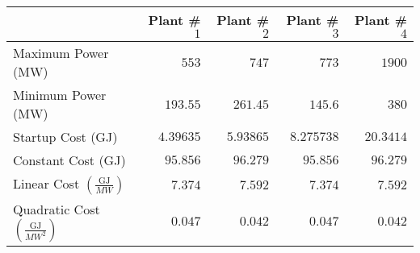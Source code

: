 \begin{tabular}{| l || r | r | r | r |}
  \hline
  & Plant \#$1$ & Plant \#$2$ & Plant \#$3$ & Plant \#$4$ \\
  \hline \hline
  Maximum Power (MW) & $553$ & $747$ & $773$ & $1900$ \\ \hline
  Minimum Power (MW) & $193.55$ & $261.45$ & $145.6$ & $380$ \\ \hline
  Startup Cost (GJ) & $4.39635$ & $5.93865$ & $8.275738$ & $20.3414$ \\ \hline
  Constant Cost (GJ) & $95.856$ & $96.279$ & $95.856$ & $96.279$ \\ \hline
  Linear Cost $(\frac{\text{GJ}}{MW})$ & $7.374$ & $7.592$ & $7.374$ & $7.592$ \\ \hline
  Quadratic Cost $(\frac{\text{GJ}}{MW^2})$ & $0.047$ & $0.042$ & $0.047$ & $0.042$ \\ \hline
\end{tabular}
